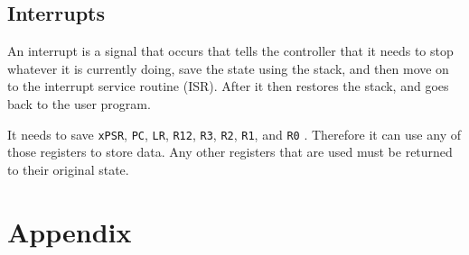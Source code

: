 \documentclass[12pt,letterpaper]{article} \usepackage{amsmath} \usepackage{graphicx} \usepackage[margin=1in]{geometry} \usepackage{longtable}  \usepackage{amssymb}
\begin{document}
	\subsection{Interrupts}
	An interrupt is a signal that occurs that tells the controller that it needs to stop whatever it is currently doing, save the state using the stack, and then move on to the interrupt service routine (ISR). After it then restores the stack, and goes back to the user program.
	
	It needs to save \verb*|xPSR|, \verb*|PC|, \verb*|LR|, \verb*|R12|, \verb*|R3|, \verb*|R2|, \verb*|R1|, and \verb*|R0| . Therefore it can use any of those registers to store data. Any other registers that are used must be returned to their original state. 
	
	\newpage 
	\section{Appendix}
	
	
	
	
	
\end{document}
